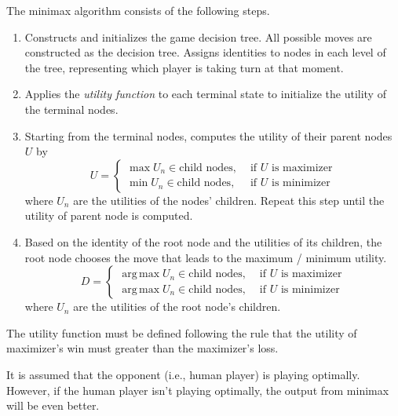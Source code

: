 \documentclass{note}
\DeclareMathOperator*{\argmax}{arg\,max}
\begin{document}
The minimax algorithm consists of the following steps.
\begin{enumerate}
    \item Constructs and initializes the game decision tree. All possible moves are constructed as the decision tree. Assigns identities to nodes in each level of the tree, representing which player is taking turn at that moment.
    \item Applies the \textit{utility function} to each terminal state to initialize the utility of the terminal nodes.
    \item Starting from the terminal nodes, computes the utility of their parent nodes $U$ by
    \begin{equation*}
        U = \begin{cases}
            \max U_n \in \text{child nodes}, & \text{ if } U \text{ is maximizer} \\
            \min U_n \in \text{child nodes}, & \text{ if } U \text{ is minimizer} 
        \end{cases}
    \end{equation*}
    where $U_n$ are the utilities of the nodes' children. Repeat this step until the utility of parent node is computed.
    \item Based on the identity of the root node and the utilities of its children, the root node chooses the move that leads to the maximum / minimum utility.
    \begin{equation*}
        D = \begin{cases}
            \argmax U_n \in \text{child nodes}, & \text{ if } U \text{ is maximizer} \\
            \argmax U_n \in \text{child nodes}, & \text{ if } U \text{ is minimizer} 
        \end{cases}
    \end{equation*}
    where $U_n$ are the utilities of the root node's children.
\end{enumerate}

\begin{tip}
    The utility function must be defined following the rule that the utility of maximizer's win must greater than the maximizer's loss.
\end{tip}

\begin{note}
    It is assumed that the opponent (i.e., human player) is playing optimally. However, if the human player isn't playing optimally, the output from minimax will be even better.
\end{note}
\end{document}
